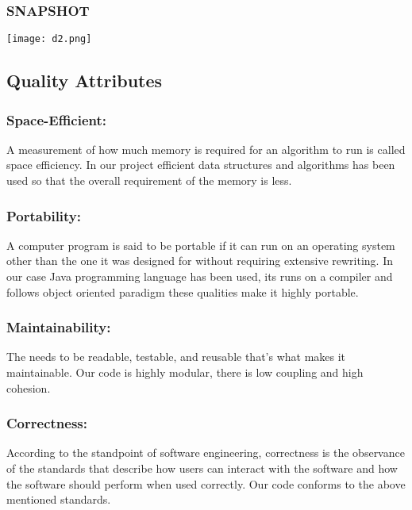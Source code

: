 \documentclass[a4paper,12pt]{article}
\begin{document}
\subsubsection{SNAPSHOT}

\texttt{[image: d2.png]}\\[1cm]


\subsection{\large Quality Attributes}
\subsubsection{\bfseries Space-Efficient:}\item A measurement of how much memory is required for an algorithm to run is called space efficiency. In our project efficient data structures and algorithms has been used so that the overall requirement of the memory is less.\\
\subsubsection{\bfseries Portability:}\item A computer program is said to be portable if it can run on an operating system other than the one it was designed for without requiring extensive rewriting. In our case Java programming language has been used, its runs on a compiler and follows object oriented paradigm these qualities make it highly portable. \\
\subsubsection{\bfseries Maintainability:}\item The needs to be readable, testable, and reusable that's what makes it maintainable. Our code is highly modular, there is low coupling and high cohesion.\\
\subsubsection{\bfseries Correctness:}\item According to the standpoint of software engineering, correctness is the observance of the standards that describe how users can interact with the software and how the software should perform when used correctly. Our code conforms to the above mentioned standards.\\
\end{document}
